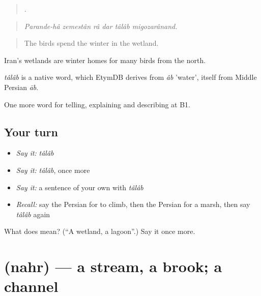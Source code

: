 \begin{quote}
      .
\end{quote}

\begin{quote}
\emph{Parande-hâ zemestân râ dar tâlâb migozarânand.}
\end{quote}

\begin{quote}
The birds spend the winter in the wetland.
\end{quote}

Iran's wetlands are winter homes for many birds from the north.

\begin{cousinweb}
\emph{tâlâb} is a native word, which EtymDB derives from \emph{âb} 'water', itself from Middle Persian \emph{āb}.
\end{cousinweb}

\begin{grammarlens}[title={What you've built}]
One more word for telling, explaining and describing at B1.
\end{grammarlens}

\subsection*{Your turn}
\begin{itemize}
\raggedright
  \item \emph{Say it:} \emph{tâlâb}
  \item \emph{Say it:} \emph{tâlâb}, once more
  \item \emph{Say it:} a sentence of your own with \emph{tâlâb}
  \item \emph{Recall:} say the Persian for to climb, then the Persian for a marsh, then say \emph{tâlâb} again
\end{itemize}

\begin{tcolorbox}[breakable,colback=teal!4,colframe=teal!35!black,title={Before you move on}]
What does  mean? (\textquotedblleft{}A wetland, a lagoon\textquotedblright{}.) Say it once more.
\end{tcolorbox}
\section[\texorpdfstring{\fa{نهر} (nahr)}{نهر (nahr)}]{ (nahr) — a stream, a brook; a channel}

\label{lesson:FA-C469-nahr}




